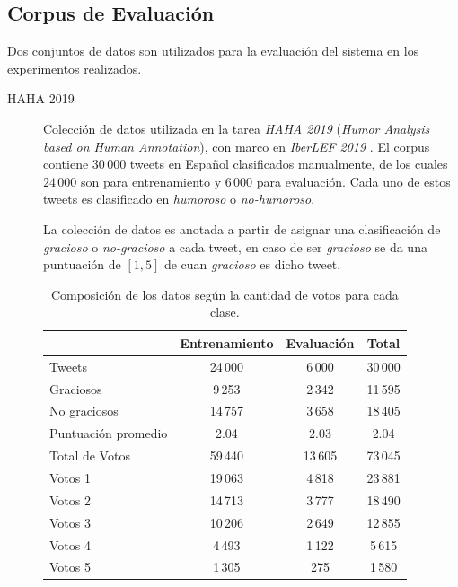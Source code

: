 \subsection{Corpus de Evaluación}\label{section:evaluation-corpus}

Dos conjuntos de datos son utilizados para la evaluación del sistema en los experimentos realizados.

\begin{description}

\item[HAHA 2019]
Colección de datos utilizada en la tarea \emph{HAHA 2019} (\emph{Humor Analysis based on Human Annotation}), con marco en \emph{IberLEF 2019} \parencite{chiruzzo2019overview}.
El corpus contiene $30\,000$ tweets en Español clasificados manualmente, de los cuales $24\,000$ son para entrenamiento y $6\,000$ para evaluación.
Cada uno de estos tweets es clasificado en \emph{humoroso} o \emph{no-humoroso}.

La colección de datos es anotada a partir de asignar una clasificación de \emph{gracioso} o \emph{no-gracioso} a cada tweet, en caso de ser \emph{gracioso} se da una puntuación de $[1,5]$ de cuan \emph{gracioso} es dicho tweet.

\begin{table}[h]
    \centering
    \begin{tabular}{lccc}
    \toprule
                            & Entrenamiento & Evaluación & Total   \\\midrule
        Tweets              & 24\,000       & 6\,000     & 30\,000 \\
        Graciosos           & 9\,253        & 2\,342     & 11\,595 \\
        No graciosos        & 14\,757       & 3\,658     & 18\,405 \\
        Puntuación promedio & 2.04          & 2.03       & 2.04    \\\midrule
        Total de Votos      & 59\,440       & 13\,605    & 73\,045 \\
        Votos 1             & 19\,063       & 4\,818     & 23\,881 \\
        Votos 2             & 14\,713       & 3\,777     & 18\,490 \\
        Votos 3             & 10\,206       & 2\,649     & 12\,855 \\
        Votos 4             &  4\,493       & 1\,122     &  5\,615 \\
        Votos 5             &  1\,305       &    275     &  1\,580 \\
    \bottomrule
    \end{tabular}
    \caption{Composición de los datos según la cantidad de votos para cada clase.}
    \label{table:haha2019info}
\end{table}


\end{description}
